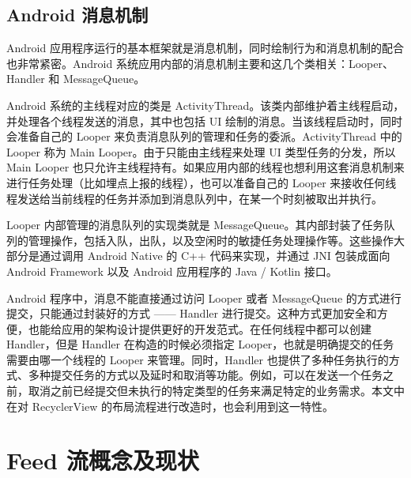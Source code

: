 \subsection{Android 消息机制}

Android 应用程序运行的基本框架就是消息机制，同时绘制行为和消息机制的配合也非常紧密。Android 系统应用内部的消息机制主要和这几个类相关：Looper、Handler 和 MessageQueue。

Android 系统的主线程对应的类是 ActivityThread。该类内部维护着主线程启动，并处理各个线程发送的消息，其中也包括 UI 绘制的消息。当该线程启动时，同时会准备自己的 Looper 来负责消息队列的管理和任务的委派。ActivityThread 中的 Looper 称为 Main Looper。由于只能由主线程来处理 UI 类型任务的分发，所以 Main Looper 也只允许主线程持有。如果应用内部的线程也想利用这套消息机制来进行任务处理（比如埋点上报的线程），也可以准备自己的 Looper 来接收任何线程发送给当前线程的任务并添加到消息队列中，在某一个时刻被取出并执行。

Looper 内部管理的消息队列的实现类就是 MessageQueue。其内部封装了任务队列的管理操作，包括入队，出队，以及空闲时的敏捷任务处理操作等\cite{goransson2014efficient}。这些操作大部分是通过调用 Android Native 的 C++ 代码来实现，并通过 JNI 包装成面向 Android Framework 以及 Android 应用程序的 Java / Kotlin 接口。

Android 程序中，消息不能直接通过访问 Looper 或者 MessageQueue 的方式进行提交，只能通过封装好的方式 —— Handler 进行提交。这种方式更加安全和方便，也能给应用的架构设计提供更好的开发范式。在任何线程中都可以创建 Handler，但是 Handler 在构造的时候必须指定 Looper，也就是明确提交的任务需要由哪一个线程的 Looper 来管理\cite{fan2018efficiently}。同时，Handler 也提供了多种任务执行的方式、多种提交任务的方式以及延时和取消等功能。例如，可以在发送一个任务之前，取消之前已经提交但未执行的特定类型的任务来满足特定的业务需求。本文中在对 RecyclerView 的布局流程进行改造时，也会利用到这一特性。

\section{Feed 流概念及现状}


